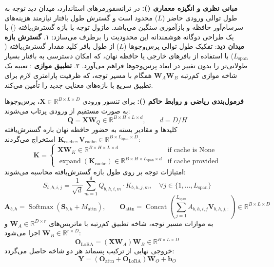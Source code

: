 \textbf{مبانی نظری و انگیزه معماری ():}
در ترانسفورمرهای استاندارد، میدان دید توجه به طول توالی ورودی حاضر ($L$) محدود است و گسترش طول بافتار نیازمند هزینه‌های سرسام‌آور حافظه و بازآموزی سنگین می‌باشد. ماژول توجه با بازه گسترش‌یافته () با یک طراحی دوگانه هوشمندانه این محدودیت را برطرف می‌سازد:
۱. \textbf{گسترش بازه میدان دید}: تفکیک طول توالی پرس‌وجوها ($L$) از طول بافر کلید-مقدار گسترش‌یافته ($L_{\text{span}}$) با استفاده از بافرهای خارجی یا حافظه نهان، که امکان دسترسی به بافتار بسیار طولانی‌تر را بدون تغییر در ابعاد پرس‌وجوها فراهم می‌آورد.
۲. \textbf{تطبیق موازی }: تعبیه یک شاخه موازی کم‌رتبه $\mathbf{W}_A \mathbf{W}_B$ همگام با مسیر توجه، که ظرفیت پارامتری لازم برای تطبیق سریع با بازه‌های معنایی جدید را تأمین می‌کند.

\textbf{فرمول‌بندی ریاضی و روابط حاکم ():}
برای تنسور ورودی $\mathbf{X} \in \mathbb{R}^{B \times L \times D}$، پرس‌وجوها به صورت مستقیم از ورودی پرتاب می‌شوند:
\begin{equation}
\mathbf{Q} = \mathbf{X} \mathbf{W}_Q \in \mathbb{R}^{B \times H \times L \times d}, \qquad d = D / H
\end{equation}
کلیدها و مقادیر بسته به حضور حافظه نهان بازه گسترش‌یافته $\mathbf{K}_{\text{cache}}, \mathbf{V}_{\text{cache}} \in \mathbb{R}^{B \times L_{\text{span}} \times D}$ استخراج می‌گردند:
\begin{equation}
\mathbf{K} = \begin{cases}
\mathbf{X}\mathbf{W}_K \in \mathbb{R}^{B \times H \times L \times d} & \text{if cache is None} \\
\operatorname{expand}(\mathbf{K}_{\text{cache}}) \in \mathbb{R}^{B \times H \times L_{\text{span}} \times d} & \text{if cache provided}
\end{cases}
\end{equation}
امتیازات توجه بر روی طول بازه گسترش‌یافته محاسبه می‌شوند:
\begin{equation}
S_{b, h, i, j} = \frac{1}{\sqrt{d}} \sum_{m=1}^d Q_{b, h, i, m} \cdot K_{b, h, j, m}, \quad \forall j \in \{1, \dots, L_{\text{span}}\}
\end{equation}
\begin{equation}
\mathbf{A}_{b, h} = \operatorname{Softmax}(\mathbf{S}_{b, h} + M_{\text{attn}}), \qquad
\mathbf{O}_{\text{attn}} = \operatorname{Concat}\left(\sum_{j=1}^{L_{\text{span}}} A_{b, h, i, j} \mathbf{V}_{b, h, j, :}\right) \in \mathbb{R}^{B \times L \times D}
\end{equation}
به موازات مسیر توجه، شاخه تطبیق کم‌رتبه  با ماتریس‌های $\mathbf{W}_A \in \mathbb{R}^{D \times r}$ و $\mathbf{W}_B \in \mathbb{R}^{r \times D}$ اجرا می‌شود:
\begin{equation}
\mathbf{O}_{\text{LoRA}} = (\mathbf{X} \mathbf{W}_A) \mathbf{W}_B \in \mathbb{R}^{B \times L \times D}
\end{equation}
خروجی نهایی از ترکیب پسماند هر دو شاخه حاصل می‌گردد:
\begin{equation}
\mathbf{Y} = (\mathbf{O}_{\text{attn}} + \mathbf{O}_{\text{LoRA}}) \mathbf{W}_O + \mathbf{b}_O
\end{equation}

